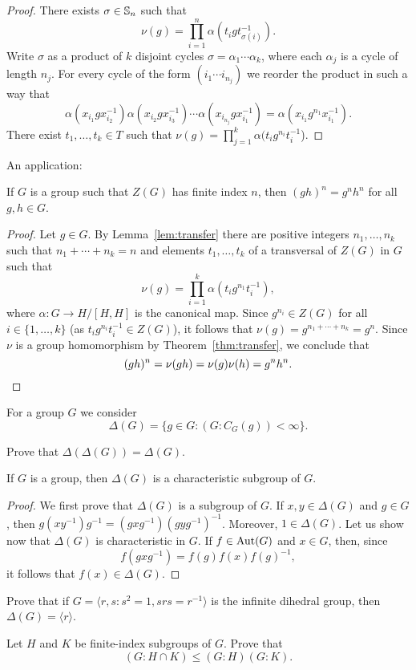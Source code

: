 \begin{proof}
	There exists $\sigma\in\mathbb{S}_n$ such that 
	\[
	\nu(g)=\prod_{i=1}^n \alpha( t_igt_{\sigma(i)}^{-1}). 
	\]
	Write $\sigma$ as a product of $k$ disjoint cycles
	$\sigma=\alpha_1\cdots\alpha_k$, where each $\alpha_j$ is a cycle of length 
	$n_j$. For every cycle of the form $(i_1\cdots i_{n_j})$
	we reorder the product in such a way that 
	\[
		\alpha(x_{i_1}gx_{i_2}^{-1})\alpha(x_{i_2}gx_{i_3}^{-1})\cdots \alpha(x_{i_{n_j}}gx_{i_1}^{-1})=\alpha(x_{i_1}g^{n_1}x_{i_1}^{-1}).
	\]
	There exist $t_1,\dots,t_k\in T$ such that 
	$\nu(g)=\prod_{j=1}^k \alpha(t_ig^{n_i}t_i^{-1}$). 
\end{proof}

An application:

\begin{proposition}
	\label{pro:center}
	If $G$ is a group such that $Z(G)$ has finite index $n$, then
	$(gh)^n=g^nh^n$ for all $g,h\in G$.	
\end{proposition}

\begin{proof}
	Let $g\in G$. By Lemma~\ref{lem:transfer} there are positive integers 
    $n_1,\dots,n_k$ such that $n_1+\cdots+n_k=n$ and elements 
	$t_1,\dots,t_k$ of a transversal of $Z(G)$ in $G$ such that 
	\[
		\nu(g)=\prod_{i=1}^k \alpha(t_ig^{n_1}t_i^{-1}),
	\]
	where $\alpha\colon G\to H/[H,H]$ is the canonical map. Since
	$g^{n_i}\in Z(G)$ for all $i\in\{1,\dots,k\}$ (as $t_ig^{n_i}t_i^{-1}\in Z(G)$), 
	it follows that 
	$\nu(g)=g^{n_1+\cdots+n_k}=g^n$.  Since $\nu$ is a group homomorphism by 
	Theorem~\ref{thm:transfer}, we conclude that 
	\[
		(gh)^n=\nu(gh)=\nu(g)\nu(h)=g^nh^n. \qedhere 
	\]
\end{proof}

For a group $G$ we consider 
\[
	\Delta(G)=\{g\in G:(G:C_G(g))<\infty\}.
\]

\begin{exercise}
	Prove that $\Delta(\Delta(G))=\Delta(G)$.
\end{exercise}

\begin{lemma}
	If $G$ is a group, then $\Delta(G)$ 
	is a characteristic subgroup of $G$.
\end{lemma}

\begin{proof}
	We first prove that $\Delta(G)$ is a subgroup of $G$. If $x,y\in\Delta(G)$
	and $g\in G$, then $g(xy^{-1})g^{-1}=(gxg^{-1})(gyg^{-1})^{-1}$. Moreover, 
	$1\in\Delta(G)$. Let us show now that $\Delta(G)$ is characteristic in $G$. If 
	$f\in\operatorname{Aut}(G)$ and $x\in G$, then, since 
	\[
	f(gxg^{-1})=f(g)f(x)f(g)^{-1},
	\]
	it follows that $f(x)\in\Delta(G)$.
\end{proof}

\begin{exercise}
	Prove that if $G=\langle r,s:s^2=1,srs=r^{-1}\rangle$ is the
	infinite dihedral group, then $\Delta(G)=\langle r\rangle$.
\end{exercise}

\begin{exercise}
	Let $H$ and $K$ be finite-index subgroups of $G$. Prove that
	\[
	(G:H\cap K)\leq (G:H)(G:K). 
	\]
\end{exercise}

